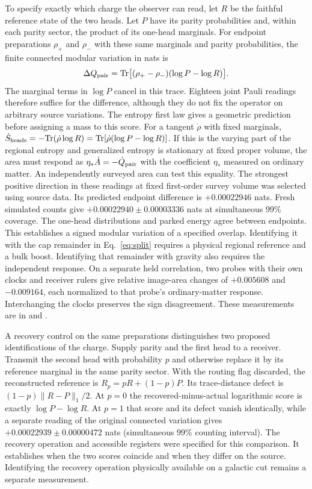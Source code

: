 \documentclass[11pt]{article}
\begin{document}
To specify exactly which charge the observer can read, let $R$ be the
faithful reference state of the two heads. Let $P$ have its parity
probabilities and, within each parity sector, the product of its
one-head marginals. For endpoint preparations $\rho_+$ and $\rho_-$
with these same marginals and parity probabilities, the finite
connected modular variation in nats is
\[
  \Delta Q_{\rm pair}
    = {\rm Tr}\big[(\rho_+-\rho_-)(\log P-\log R)\big].
\]
The marginal terms in $\log P$ cancel in this trace. Eighteen joint
Pauli readings therefore suffice for the difference, although they
do not fix the operator on arbitrary source variations. The entropy
first law gives a geometric prediction before assigning a mass to this
score. For a tangent $\dot\rho$ with fixed marginals,
$\dot S_{\rm heads}=-{\rm Tr}(\dot\rho\log R)
={\rm Tr}[\dot\rho(\log P-\log R)]$. If this is the varying part of
the regional entropy and generalized entropy is stationary at fixed
proper volume, the area must respond as
$\eta_*\dot A=-\dot Q_{\rm pair}$ with the coefficient $\eta_*$
measured on ordinary matter. An independently surveyed area can
test this equality. The strongest
positive direction in these readings at fixed first-order survey
volume was selected using source data. Its predicted endpoint
difference is $+0.00022946$ nats. Fresh simulated counts give
$+0.00022940\pm0.00003336$ nats at simultaneous 99\% coverage.
The one-head distributions and parked energy agree between endpoints.
This establishes a signed modular variation of a specified overlap.
Identifying it with the cap remainder in Eq.~\eqref{eq:split}
requires a physical regional reference and a bulk boost. Identifying
that remainder with gravity also requires the independent response.
On a separate held correlation, two probes with their own clocks and
receiver rulers give relative image-area changes of $+0.005608$ and
$-0.009164$, each normalized to that probe's ordinary-matter response.
Interchanging the clocks preserves the sign disagreement. These
measurements are in 
and .

A recovery control on the same preparations distinguishes two proposed
identifications of the charge. Supply parity and the first head to a
receiver. Transmit the second head with probability $p$ and otherwise
replace it by its reference marginal in the same parity sector. With
the routing flag discarded, the reconstructed reference is
$R_p=pR+(1-p)P$. Its trace-distance defect is
$(1-p)\lVert R-P\rVert_1/2$. At $p=0$ the recovered-minus-actual
logarithmic score is exactly $\log P-\log R$. At $p=1$ that score
and its defect vanish identically, while a separate reading of the
original connected variation gives $+0.00022939\pm0.00000472$ nats
(simultaneous 99\% counting interval). The recovery operation and
accessible registers were specified for this comparison. It establishes
when the two scores coincide and when they differ on the source.
Identifying the recovery operation physically available on a galactic
cut remains a separate measurement.
\end{document}
